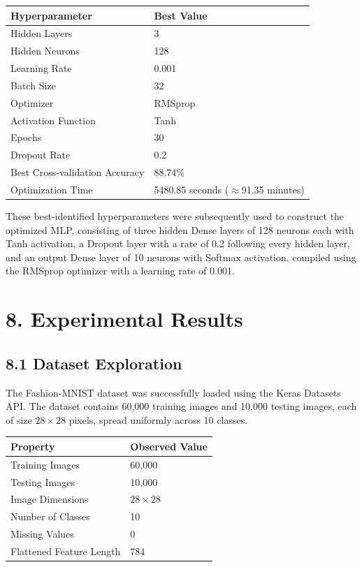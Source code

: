 \documentclass[11pt,a4paper]{article}
\begin{document}
\begin{center}
\begin{tabular}{|p{6cm}|p{6cm}|}
\hline
\textbf{Hyperparameter} & \textbf{Best Value}\\
\hline
Hidden Layers & 3\\
\hline
Hidden Neurons & 128\\
\hline
Learning Rate & 0.001\\
\hline
Batch Size & 32\\
\hline
Optimizer & RMSprop\\
\hline
Activation Function & Tanh\\
\hline
Epochs & 30\\
\hline
Dropout Rate & 0.2\\
\hline
Best Cross-validation Accuracy & 88.74\%\\
\hline
Optimization Time & 5480.85 seconds ($\approx$91.35 minutes)\\
\hline
\end{tabular}
\end{center}

\vspace{0.3cm}

These best-identified hyperparameters were subsequently used to construct the optimized MLP, consisting of three hidden Dense layers of 128 neurons each with Tanh activation, a Dropout layer with a rate of 0.2 following every hidden layer, and an output Dense layer of 10 neurons with Softmax activation, compiled using the RMSprop optimizer with a learning rate of 0.001.
\section*{8. Experimental Results}




\subsection*{8.1 Dataset Exploration}

The Fashion-MNIST dataset was successfully loaded using the Keras Datasets API. The dataset contains 60{,}000 training images and 10{,}000 testing images, each of size $28\times28$ pixels, spread uniformly across 10 classes.

\begin{center}
\begin{tabular}{|p{6cm}|p{5cm}|}
\hline
\textbf{Property} & \textbf{Observed Value}\\
\hline
Training Images & 60{,}000\\
\hline
Testing Images & 10{,}000\\
\hline
Image Dimensions & $28\times28$\\
\hline
Number of Classes & 10\\
\hline
Missing Values & 0\\
\hline
Flattened Feature Length & 784\\
\hline
\end{tabular}
\end{center}
\end{document}
